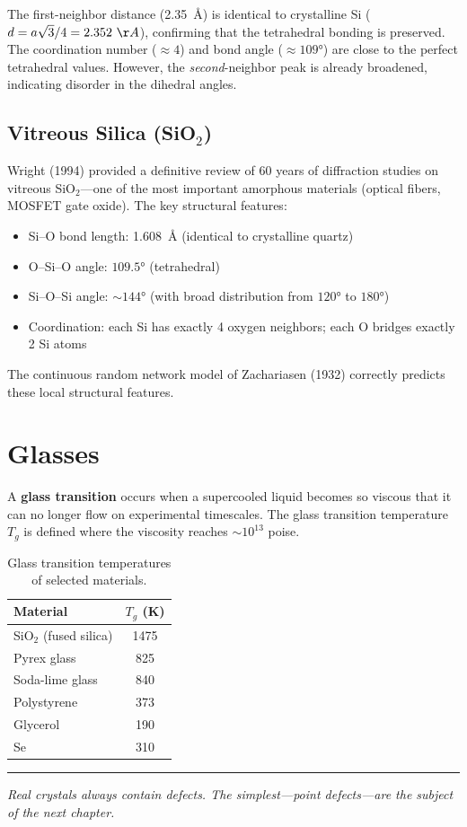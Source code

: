 The first-neighbor distance (2.35~\AA{}) is identical to crystalline Si ($d = a\sqrt{3}/4 = 2.352~\AA{}$), confirming that the tetrahedral bonding is preserved. The coordination number ($\approx 4$) and bond angle ($\approx 109°$) are close to the perfect tetrahedral values. However, the \textit{second}-neighbor peak is already broadened, indicating disorder in the dihedral angles.

\subsection{Vitreous Silica (SiO$_2$)}

Wright (1994) provided a definitive review of 60 years of diffraction studies on vitreous SiO$_2$---one of the most important amorphous materials (optical fibers, MOSFET gate oxide). The key structural features:
\begin{itemize}[nosep]
  \item Si--O bond length: 1.608~\AA{} (identical to crystalline quartz)
  \item O--Si--O angle: $109.5°$ (tetrahedral)
  \item Si--O--Si angle: $\sim 144°$ (with broad distribution from $120°$ to $180°$)
  \item Coordination: each Si has exactly 4 oxygen neighbors; each O bridges exactly 2 Si atoms
\end{itemize}

The continuous random network model of Zachariasen (1932) correctly predicts these local structural features.


\section{Glasses}

A \textbf{glass transition} occurs when a supercooled liquid becomes so viscous that it can no longer flow on experimental timescales. The glass transition temperature $T_g$ is defined where the viscosity reaches $\sim 10^{13}$ poise.

\begin{table}[H]
\centering
\caption{Glass transition temperatures of selected materials.}
\label{tab:glass}
\begin{tabular}{@{}lS@{}}
\toprule
Material & {$T_g$ (\si{\kelvin})} \\
\midrule
SiO$_2$ (fused silica) & 1475 \\
Pyrex glass & 825 \\
Soda-lime glass & 840 \\
Polystyrene & 373 \\
Glycerol & 190 \\
Se & 310 \\
\bottomrule
\end{tabular}
\end{table}

\vspace{1cm}
\noindent\rule{\textwidth}{0.4pt}
\textit{Real crystals always contain defects. The simplest---point defects---are the subject of the next chapter.}
